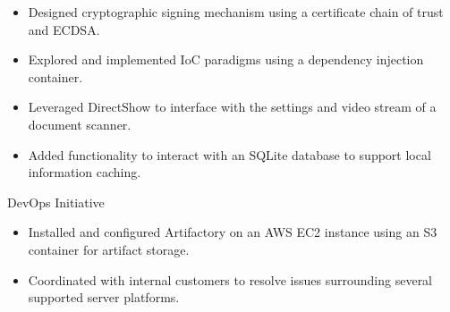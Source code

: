 \begin{cventries}
{\begin{cvitems}
{\begin{itemize}
        \item Designed cryptographic signing mechanism using a certificate chain of trust and ECDSA.
        \item Explored and implemented IoC paradigms using a dependency injection container.
        \item Leveraged DirectShow to interface with the settings and video stream of a document scanner.
        \item Added functionality to interact with an SQLite database to support local information caching.
      \end{itemize}
    }
    \item
    {
      {DevOps Initiative}
      \begin{itemize}
        \item Installed and configured Artifactory on an AWS EC2 instance using an S3 container for artifact storage.
        \item Coordinated with internal customers to resolve issues surrounding several supported server platforms.
      \end{itemize}
    }
    \end{cvitems}
  }
\end{cventries}
